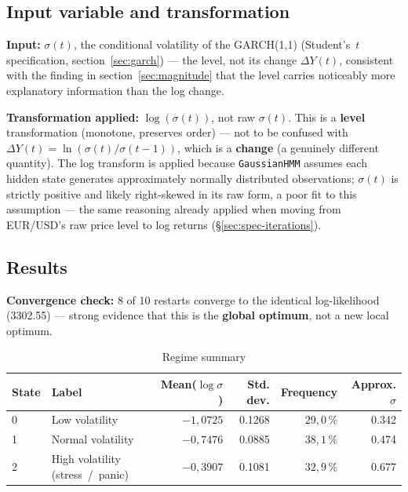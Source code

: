 \documentclass[12pt,a4paper]{article}
\begin{document}
\subsection{Input variable and transformation}

\textbf{Input:} $\sigma(t)$, the conditional volatility of the
GARCH(1,1) (Student's~$t$ specification, section~\ref{sec:garch}) ---
the level, not its change $\Delta Y(t)$, consistent with the
finding in section~\ref{sec:magnitude} that the level carries
noticeably more explanatory information than the log change.

\textbf{Transformation applied:} $\log(\sigma(t))$, not raw
$\sigma(t)$. This is a \textbf{level} transformation (monotone, preserves
order) --- not to be confused with \\ $\Delta Y(t) =
\ln(\sigma(t)/\sigma(t-1))$, which is a \textbf{change} (a
genuinely different quantity). The log transform is applied
because \texttt{GaussianHMM} assumes each hidden state generates
approximately normally distributed observations; $\sigma(t)$
is strictly positive and likely right-skewed in its
raw form, a poor fit to this assumption --- the same
reasoning already applied when moving from EUR/USD's raw price
level to log returns (\S\ref{sec:spec-iterations}).



\subsection{Results}

\textbf{Convergence check:} 8 of 10 restarts converge
to the identical log-likelihood (3302.55) --- strong evidence that this
is the \textbf{global optimum}, not a new local optimum. %

\begin{table}[H]
	\centering
	\caption{Regime summary}
	\begin{tabular}{llrrrr}
		\toprule
		State & Label & Mean($\log\sigma$) & Std. dev. & Frequency & Approx. $\sigma$ \\
		\midrule
		0 & Low volatility & $-1{,}0725$ & 0.1268 & $29{,}0\,\%$ & 0.342 \\
		1 & Normal volatility & $-0{,}7476$ & 0.0885 & $38{,}1\,\%$ & 0.474 \\
		2 & High volatility (stress~/~panic) & $-0{,}3907$ & 0.1081 & $32{,}9\,\%$ & 0.677 \\
		\bottomrule
	\end{tabular}
\end{table}
\end{document}
